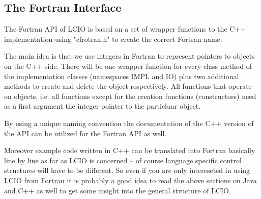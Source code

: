 \subsection{The Fortran Interface} \label{f77api}

The Fortran API of LCIO is based on a set of wrapper functions to the 
C++ implementation using "cfrotran.h" to create the correct Fortran name.

The main idea is that we use integers in Fortran to represent pointers to 
objects on the C++ side. There will be one wrapper function for every class method
of the implementation classes (namespaces IMPL and IO) plus two additional methods 
to create and delete the object respectively. All functions that operate on objects, i.e.
all functions except for the creation functions (constructors) need as a first argument 
the integer pointer to the particluar object.

By using a unique naming convention the documentation of the C++ version of the API
can be utilized for the Fortran API as well.

Moreover example code written in C++ can be translated into Fortran basically line by 
line as far as LCIO is concerned -- of course language specific control structures 
will have to be different. So even if you are only intereseted in using LCIO from Fortran 
it is probably a good idea to read the above sections on Java and C++ as well to get some 
insight into the general structure of LCIO.

